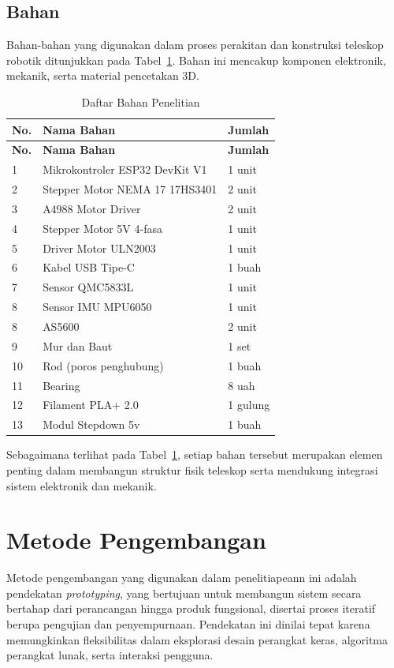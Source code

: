 \subsection{Bahan} \label{III.Bahan}
Bahan-bahan yang digunakan dalam proses perakitan dan konstruksi teleskop robotik ditunjukkan pada Tabel~\ref{table:3.bahan}. Bahan ini mencakup komponen elektronik, mekanik, serta material pencetakan 3D.
\begin{longtable}{| b{}|p{}|p{}|} %
	\caption{Daftar Bahan Penelitian}
	\label{table:3.bahan} \\
	\hline
	\textbf{No.} & \textbf{Nama Bahan} & \textbf{Jumlah} \\
	\hline
	\endfirsthead
	
	\hline
	\textbf{No.} & \textbf{Nama Bahan} & \textbf{Jumlah} \\
	\hline
	\endhead
	
	1 & Mikrokontroler ESP32 DevKit V1 & 1 unit \\
	\hline
	2 & Stepper Motor NEMA 17 17HS3401 & 2 unit \\
	\hline
	3 & A4988 Motor Driver & 2 unit \\
	\hline
	4 & Stepper Motor 5V 4-fasa & 1 unit \\
	\hline
	5 & Driver Motor ULN2003 & 1 unit \\
	\hline
	6 & Kabel USB Tipe-C & 1 buah \\
	\hline
	7 & Sensor QMC5833L & 1 unit \\
	\hline
	8 & Sensor IMU MPU6050 & 1 unit \\
	\hline
	8 & AS5600 & 2 unit \\
	\hline
	9 & Mur dan Baut & 1 set \\
	\hline
	10 & Rod (poros penghubung) & 1 buah \\
	\hline
	11 & Bearing & 8 uah \\
	\hline
	12 & Filament PLA+ 2.0 & 1 gulung \\
	\hline
	13 & Modul Stepdown 5v & 1 buah \\
	\hline
\end{longtable}
Sebagaimana terlihat pada Tabel~\ref{table:3.bahan}, setiap bahan tersebut merupakan elemen penting dalam membangun struktur fisik teleskop serta mendukung integrasi sistem elektronik dan mekanik.

\section{Metode Pengembangan} \label{III.Metode}
Metode pengembangan yang digunakan dalam penelitiapeann ini adalah pendekatan \textit{prototyping}, yang bertujuan untuk membangun sistem secara bertahap dari perancangan hingga produk fungsional, disertai proses iteratif berupa pengujian dan penyempurnaan. Pendekatan ini dinilai tepat karena memungkinkan fleksibilitas dalam eksplorasi desain perangkat keras, algoritma perangkat lunak, serta interaksi pengguna.

